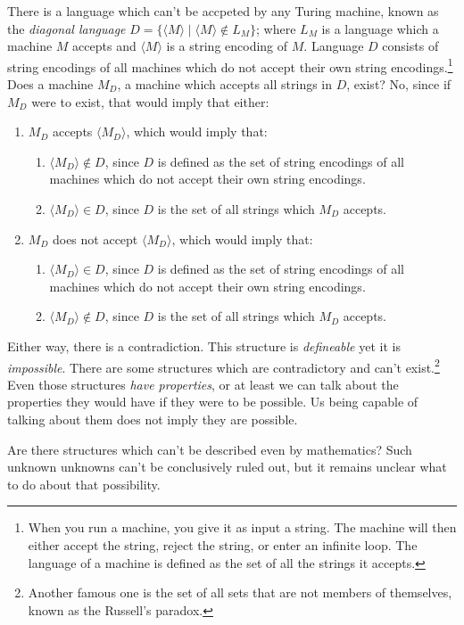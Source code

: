 There is a language which can't be accpeted by any Turing machine, known as the \textit{diagonal language} $D = \{\langle M \rangle \mid \langle M \rangle \notin L_M \}$; where $L_M$ is a language which a machine $M$ accepts and $\langle M \rangle$ is a string encoding of $M$.
Language $D$ consists of string encodings of all machines which do not accept their own string encodings.\footnote
{
When you run a machine, you give it as input a string.
The machine will then either accept the string, reject the string, or enter an infinite loop.
The language of a machine is defined as the set of all the strings it accepts.
}
Does a machine $M_D$, a machine which accepts all strings in $D$, exist?
No, since if $M_D$ were to exist, that would imply that either:
\begin{enumerate}
\item $M_D$ accepts $\langle M_D \rangle$, which would imply that:
\begin{enumerate}
\item $\langle M_D \rangle \notin D$, since $D$ is defined as the set of string encodings of all machines which do not accept their own string encodings.
\item $\langle M_D \rangle \in D$, since $D$ is the set of all strings which $M_D$ accepts.
\end{enumerate}
\item $M_D$ does not accept $\langle M_D \rangle$, which would imply that:
\begin{enumerate}
\item $\langle M_D \rangle \in D$, since $D$ is defined as the set of string encodings of all machines which do not accept their own string encodings.
\item $\langle M_D \rangle \notin D$, since $D$ is the set of all strings which $M_D$ accepts.
\end{enumerate}
\end{enumerate}
Either way, there is a contradiction. This structure is \textit{defineable} yet it is \textit{impossible}.
There are some structures which are contradictory and can't exist.\footnote{Another famous one is the set of all sets that are not members of themselves, known as the Russell's paradox.}
Even those structures \textit{have properties}, or at least we can talk about the properties they would have if they were to be possible.
Us being capable of talking about them does not imply they are possible.

Are there structures which can't be described even by mathematics?
Such unknown unknowns can't be conclusively ruled out, but it remains unclear what to do about that possibility.

